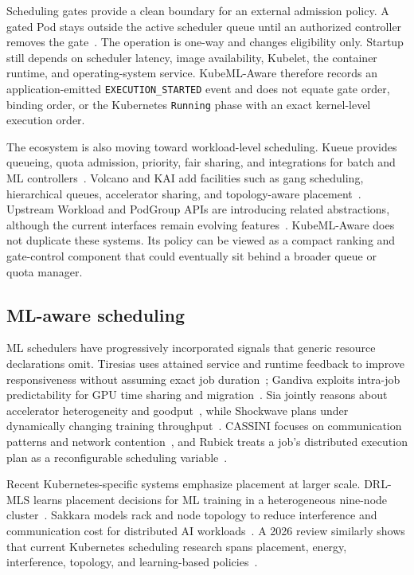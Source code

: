 \documentclass[10pt,journal,compsoc]{IEEEtran}
\newcommand{\system}{KubeML-Aware}
\begin{document}
Scheduling gates provide a clean boundary for an external admission policy. A gated Pod stays outside the active scheduler queue until an authorized controller removes the gate~\cite{kubernetesSchedulingReadiness}. The operation is one-way and changes eligibility only. Startup still depends on scheduler latency, image availability, Kubelet, the container runtime, and operating-system service. \system{} therefore records an application-emitted \texttt{EXECUTION\_STARTED} event and does not equate gate order, binding order, or the Kubernetes \texttt{Running} phase with an exact kernel-level execution order.

The ecosystem is also moving toward workload-level scheduling. Kueue provides queueing, quota admission, priority, fair sharing, and integrations for batch and ML controllers~\cite{kueue2026}. Volcano and KAI add facilities such as gang scheduling, hierarchical queues, accelerator sharing, and topology-aware placement~\cite{volcano2026,kai2026}. Upstream Workload and PodGroup APIs are introducing related abstractions, although the current interfaces remain evolving features~\cite{kubernetesWorkloadAPI}. \system{} does not duplicate these systems. Its policy can be viewed as a compact ranking and gate-control component that could eventually sit behind a broader queue or quota manager.

\subsection{ML-aware scheduling}

ML schedulers have progressively incorporated signals that generic resource declarations omit. Tiresias uses attained service and runtime feedback to improve responsiveness without assuming exact job duration~\cite{gu2019tiresias}; Gandiva exploits intra-job predictability for GPU time sharing and migration~\cite{xiao2018gandiva}. Sia jointly reasons about accelerator heterogeneity and goodput~\cite{subramanya2023sia}, while Shockwave plans under dynamically changing training throughput~\cite{zheng2023shockwave}. CASSINI focuses on communication patterns and network contention~\cite{rajasekaran2024cassini}, and Rubick treats a job's distributed execution plan as a reconfigurable scheduling variable~\cite{zhang2025rubick}.

Recent Kubernetes-specific systems emphasize placement at larger scale. DRL-MLS learns placement decisions for ML training in a heterogeneous nine-node cluster~\cite{dong2026drlmls}. Sakkara models rack and node topology to reduce interference and communication cost for distributed AI workloads~\cite{santos2026sakkara}. A 2026 review similarly shows that current Kubernetes scheduling research spans placement, energy, interference, topology, and learning-based policies~\cite{alhakimi2026review}.
\end{document}
